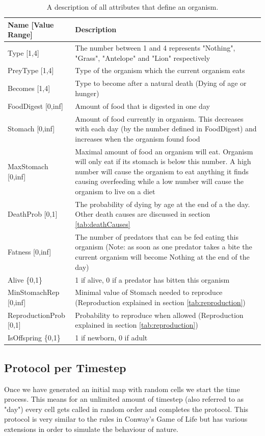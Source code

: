 \documentclass[11pt]{article}
\begin{document}
\begin{table}[htbp]
\centering
\begin{tabular}{l|p{10.3cm}}
Name [Value Range]& Description\\
\hline 
\hline 
Type [1,4]& The number between 1 and 4 represents "Nothing", "Grass", "Antelope" and "Lion" respectively  \\ 
\hline 
PreyType [1,4] & Type of the organism which the current organism eats \\ 
\hline 
Becomes [1,4]& Type to become after a natural death (Dying of age or hunger) \\ 
\hline 
FoodDigest [0,inf]& Amount of food that is digested in one day\\ 
\hline 
Stomach [0,inf]& Amount of food currently in organism. This decreases with each day (by the number defined in FoodDigest) and increases when the organism found food\\ 
\hline 
MaxStomach [0,inf]& Maximal amount of food an organism will eat. Organism will only eat if its stomach is below this number. A high number will cause the organism to eat anything it finds causing overfeeding while a low number will cause the organism to live on a diet \\ 
\hline 
DeathProb [0,1]& The probability of dying by age at the end of a the day. Other death causes are discussed in section \ref{tab:deathCauses} \\ 
\hline 
Fatness [0,inf]& The number of predators that can be fed eating this organism (Note: as soon as one predator takes a bite the current organism will become Nothing at the end of the day)\\ 
\hline 
Alive \{0,1\}& 1 if alive, 0 if a predator has bitten this organism\\
\hline 
MinStomachRep [0,inf]& Minimal value of Stomach needed to reproduce (Reproduction explained in section \ref{tab:reproduction}) \\
\hline 
ReproductionProb [0,1]& Probability to reproduce when allowed (Reproduction explained in section \ref{tab:reproduction})\\
\hline 
IsOffspring \{0,1\}& 1 if newborn, 0 if adult\\
\end{tabular}
\caption{A description of all attributes that define an organism.}
\label{tab:Properties}
\end{table}

\subsection{Protocol per Timestep}
Once we have generated an initial map with random cells we start the time process. This means for an unlimited amount of timestep (also referred to as "day") every cell gets called in random order and completes the protocol. This protocol is very similar to the rules in Conway's Game of Life but has various extensions in order to simulate the behaviour of nature.
\setcounter{protocolCounter}{1}
\end{document}
